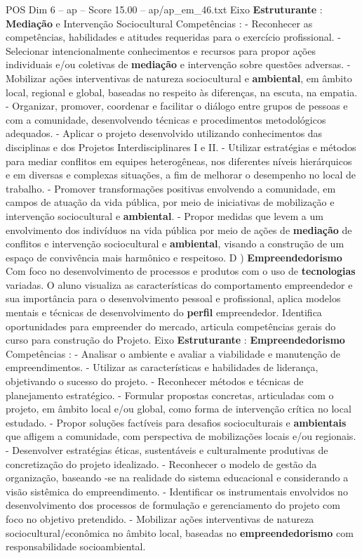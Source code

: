 \begin{textsample}{POS Dim 6 – ap – Score 15.00 – ap/ap\_em\_46.txt}
Eixo \textbf{Estruturante} : \textbf{Mediação} e Intervenção Sociocultural Competências : - Reconhecer as competências, habilidades e atitudes requeridas para o exercício profissional. - Selecionar intencionalmente conhecimentos e recursos para propor ações individuais e/ou coletivas de \textbf{mediação} e intervenção sobre questões adversas. - Mobilizar ações interventivas de natureza sociocultural e \textbf{ambiental}, em âmbito local, regional e global, baseadas no respeito às diferenças, na escuta, na empatia. - Organizar, promover, coordenar e facilitar o diálogo entre grupos de pessoas e com a comunidade, desenvolvendo técnicas e procedimentos metodológicos adequados. - Aplicar o projeto desenvolvido utilizando conhecimentos das disciplinas e dos Projetos Interdisciplinares I e II. - Utilizar estratégias e métodos para mediar conflitos em equipes heterogêneas, nos diferentes níveis hierárquicos e em diversas e complexas situações, a fim de melhorar o desempenho no local de trabalho. - Promover transformações positivas envolvendo a comunidade, em campos de atuação da vida pública, por meio de iniciativas de mobilização e intervenção sociocultural e \textbf{ambiental}. - Propor medidas que levem a um envolvimento dos indivíduos na vida pública por meio de ações de \textbf{mediação} de conflitos e intervenção sociocultural e \textbf{ambiental}, visando a construção de um espaço de convivência mais harmônico e respeitoso.
D ) \textbf{Empreendedorismo} Com foco no desenvolvimento de processos e produtos com o uso de \textbf{tecnologias} variadas.
O aluno visualiza as características do comportamento empreendedor e sua importância para o desenvolvimento pessoal e profissional, aplica modelos mentais e técnicas de desenvolvimento do \textbf{perfil} empreendedor.
Identifica oportunidades para empreender do mercado, articula competências gerais do curso para construção do Projeto.
Eixo \textbf{Estruturante} : \textbf{Empreendedorismo} Competências : - Analisar o ambiente e avaliar a viabilidade e manutenção de empreendimentos. - Utilizar as características e habilidades de liderança, objetivando o sucesso do projeto. - Reconhecer métodos e técnicas de planejamento estratégico. - Formular propostas concretas, articuladas com o projeto, em âmbito local e/ou global, como forma de intervenção crítica no local estudado. - Propor soluções factíveis para desafios socioculturais e \textbf{ambientais} que afligem a comunidade, com perspectiva de mobilizações locais e/ou regionais. - Desenvolver estratégias éticas, sustentáveis e culturalmente produtivas de concretização do projeto idealizado. - Reconhecer o modelo de gestão da organização, baseando -se na realidade do sistema educacional e considerando a visão sistêmica do empreendimento. - Identificar os instrumentais envolvidos no desenvolvimento dos processos de formulação e gerenciamento do projeto com foco no objetivo pretendido. - Mobilizar ações interventivas de natureza sociocultural/econômica no âmbito local, baseadas no \textbf{empreendedorismo} com responsabilidade socioambiental.

\end{textsample}
